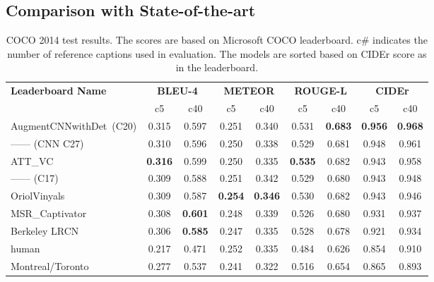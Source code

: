 \subsection{Comparison with State-of-the-art}
\begin{table}[htp]
  \newcommand{\mct}[1]{%
    \multicolumn{2}{c|}{\bf#1}}
  \centering
  \begin{adjustbox}{center}
  \begin{tabular}{|l|c|c|c|c|c|c|c|c|}
    \hline\hline
    \multirow{2}{*}{\bf Leaderboard Name}
                       &\mct{BLEU-4} &\mct{METEOR} &\mct{ROUGE-L}&\mct{CIDEr}\\\cline{2-9}
                    & c5    & c40   &  c5   & c40   & c5  &  c40  &  c5  &  c40 \\\hline\hline
    AugmentCNNwithDet~(C20)& 0.315 & 0.597 & 0.251 &0.340& 0.531 &\bf0.683&\bf0.956&\bf0.968\\
    ------ (CNN C27) & 0.310 & 0.596 & 0.250 &0.338& 0.529 & 0.681& 0.948& 0.961\\
    ATT\_VC~\cite{you2016image}& \bf0.316&0.599 & 0.250 &0.335&\bf0.535&0.682& 0.943& 0.958\\
    ------ (C17)  &  0.309 & 0.588 & 0.251 &0.342& 0.529 & 0.680& 0.943& 0.948\\
    OriolVinyals~\cite{Vinyals_2015_CVPR}      & 0.309 & 0.587 &\bf0.254&\bf0.346& 0.530 & 0.682& 0.943& 0.946\\
    MSR\_Captivator~\cite{Fang2015}  & 0.308 &\bf0.601& 0.248 &0.339& 0.526 & 0.680& 0.931& 0.937\\
    Berkeley LRCN~\cite{donahue2015long}   & 0.306 &\bf0.585& 0.247 &0.335& 0.528 & 0.678& 0.921& 0.934\\
    human~\cite{Chen2015}   & 0.217 & 0.471 & 0.252 &0.335& 0.484 & 0.626 & 0.854 & 0.910\\
    Montreal/Toronto~\cite{Xu2015show} & 0.277 & 0.537 & 0.241 &0.322& 0.516 & 0.654 & 0.865 & 0.893\\
    \hline \hline
  \end{tabular}
  \end{adjustbox}
  \caption{COCO 2014 test results. The scores are based on Microsoft
  COCO leaderboard. c\# indicates the number
  of reference captions used in evaluation. The models are sorted
  based on CIDEr score as in the leaderboard.}
  \label{tab:resCocLeaderTest}
\end{table}

